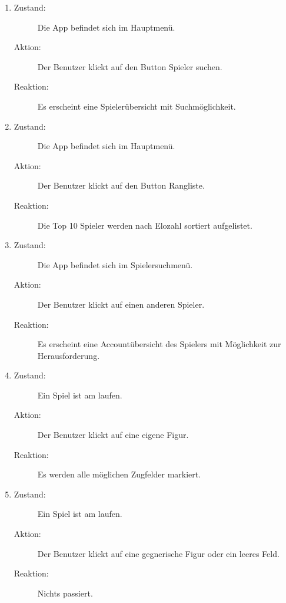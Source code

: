 \documentclass[parskip=full]{scrartcl}
\begin{document}
\begin{enumerate}
	\item
	\begin{description}
	\item[Zustand:] Die App befindet sich im Hauptmenü.
	\item[Aktion:] Der Benutzer klickt auf den Button \glqq Spieler suchen\grqq.
	\item[Reaktion:] Es erscheint eine Spielerübersicht mit Suchmöglichkeit.  \\
	\end{description}
	
	\item
	\begin{description}
	\item[Zustand:] Die App befindet sich im Hauptmenü.
	\item[Aktion:] Der Benutzer klickt auf den Button \glqq Rangliste\grqq.
	\item[Reaktion:] Die Top 10 Spieler werden nach Elozahl sortiert aufgelistet.  \\
	\end{description}
	
	\item
	\begin{description}
	\item[Zustand:] Die App befindet sich im Spielersuchmenü.
	\item[Aktion:] Der Benutzer klickt auf einen anderen Spieler.
	\item[Reaktion:] Es erscheint eine Accountübersicht des Spielers mit Möglichkeit zur Herausforderung.  \\
	\end{description}
	
	\item 
	\begin{description}
	\item[Zustand:] Ein Spiel ist am laufen.
	\item[Aktion:] Der Benutzer klickt auf eine eigene Figur.
	\item[Reaktion:] Es werden alle möglichen Zugfelder markiert.  \\
	\end{description}
	
	\item 
	\begin{description}
	\item[Zustand:] Ein Spiel ist am laufen.
	\item[Aktion:] Der Benutzer klickt auf eine gegnerische Figur oder ein leeres Feld.
	\item[Reaktion:] Nichts passiert.  \\
	\end{description}
	

\end{enumerate}
\end{document}
